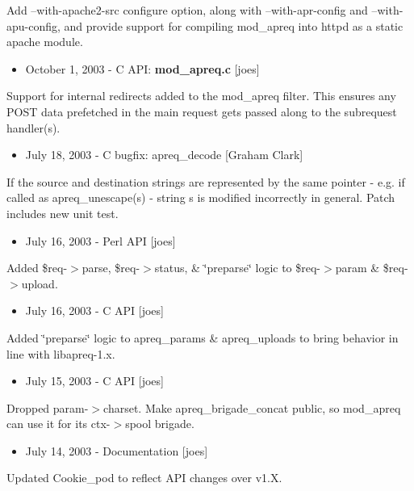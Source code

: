 Add --with-apache2-src configure option, along with --with-apr-config and --with-apu-config, and provide support for compiling mod\_\-apreq into httpd as a static apache module.

\begin{itemize}
\item October 1, 2003 - C API: {\bf mod\_\-apreq.c} [joes]\end{itemize}


Support for internal redirects added to the mod\_\-apreq filter. This ensures any POST data prefetched in the main request gets passed along to the subrequest handler(s).

\begin{itemize}
\item July 18, 2003 - C bugfix: apreq\_\-decode [Graham Clark]\end{itemize}


If the source and destination strings are represented by the same pointer - e.g. if called as apreq\_\-unescape(s) - string s is modified incorrectly in general. Patch includes new unit test.

\begin{itemize}
\item July 16, 2003 - Perl API [joes]\end{itemize}


Added \$req-$>$parse, \$req-$>$status, \& \char`\"{}preparse\char`\"{} logic to \$req-$>$param \& \$req-$>$upload.

\begin{itemize}
\item July 16, 2003 - C API [joes]\end{itemize}


Added \char`\"{}preparse\char`\"{} logic to apreq\_\-params \& apreq\_\-uploads to bring behavior in line with libapreq-1.x.

\begin{itemize}
\item July 15, 2003 - C API [joes]\end{itemize}


Dropped param-$>$charset. Make apreq\_\-brigade\_\-concat public, so mod\_\-apreq can use it for its ctx-$>$spool brigade.

\begin{itemize}
\item July 14, 2003 - Documentation [joes]\end{itemize}


Updated Cookie\_\-pod to reflect API changes over v1.X.

